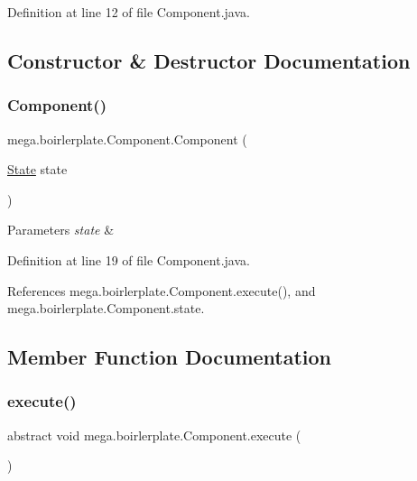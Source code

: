 Definition at line 12 of file Component.\+java.



\subsection{Constructor \& Destructor Documentation}
\mbox{\label{classmega_1_1boirlerplate_1_1_component_af8f17c88007aaedc016c1f72788d26dc}} 
\subsubsection{\texorpdfstring{Component()}{Component()}}
{\footnotesize\ttfamily mega.\+boirlerplate.\+Component.\+Component (\begin{DoxyParamCaption}\item[{\hyperlink{classmega_1_1boirlerplate_1_1_state}{State}}]{state }\end{DoxyParamCaption})}


\begin{DoxyParams}{Parameters}
{\em state} & \\
\hline
\end{DoxyParams}


Definition at line 19 of file Component.\+java.



References mega.\+boirlerplate.\+Component.\+execute(), and mega.\+boirlerplate.\+Component.\+state.



\subsection{Member Function Documentation}
\mbox{\label{classmega_1_1boirlerplate_1_1_component_a875c3bb3ba84f8187e2490ddd7fb90f4}} 
\subsubsection{\texorpdfstring{execute()}{execute()}}
{\footnotesize\ttfamily abstract void mega.\+boirlerplate.\+Component.\+execute (\begin{DoxyParamCaption}{ }\end{DoxyParamCaption})\hspace{0.3cm}{\ttfamily [abstract]}}



